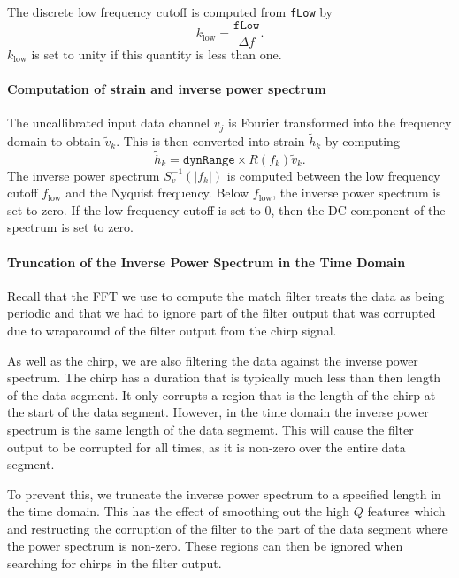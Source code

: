 The discrete low frequency cutoff is computed from \texttt{fLow} by
\begin{equation}
k_{\textrm{low}} = \frac{\texttt{fLow}}{\Delta f}.
\end{equation}
$k_{\textrm{low}}$ is set to unity if this quantity is less than one.

\paragraph*{Computation of strain and inverse power spectrum}

The uncallibrated input data channel $v_j$ is Fourier transformed into the
frequency domain to obtain $\tilde{v}_k$. This is then converted into strain
$\tilde{h}_k$ by computing 
\begin{equation}
\tilde{h}_k = \texttt{dynRange} \times R(f_k) \tilde{v}_k.
\end{equation}
The inverse power spectrum $S^{-1}_v(|f_k|)$ is computed between the low
frequency cutoff $f_{\textrm{low}}$ and the Nyquist frequency. Below
$f_{\textrm{low}}$, the inverse power spectrum is set to zero. If the low
frequency cutoff is set to $0$, then the DC component of the spectrum is
set to zero.

\paragraph*{Truncation of the Inverse Power Spectrum in the Time Domain}

Recall that the FFT we use to compute the match filter treats the data as
being periodic and that we had to ignore part of the filter output that was
corrupted due to wraparound of the filter output from the chirp signal. 

As well as the chirp, we are also filtering the data against the inverse power
spectrum. The chirp has a duration that is typically much less than then
length of the data segment. It only corrupts a region that is the length of
the chirp at the start of the data segment. However, in the time domain the
inverse power spectrum is the same length of the data segmemt. This will cause
the filter output to be corrupted for all times, as it is non-zero over the
entire data segment.

To prevent this, we truncate the inverse power spectrum to a specified length
in the time domain. This has the effect of smoothing out the high $Q$ features
which and restructing the corruption of the filter to the part of the data
segment where the power spectrum is non-zero. These regions can then be
ignored when searching for chirps in the filter output.

